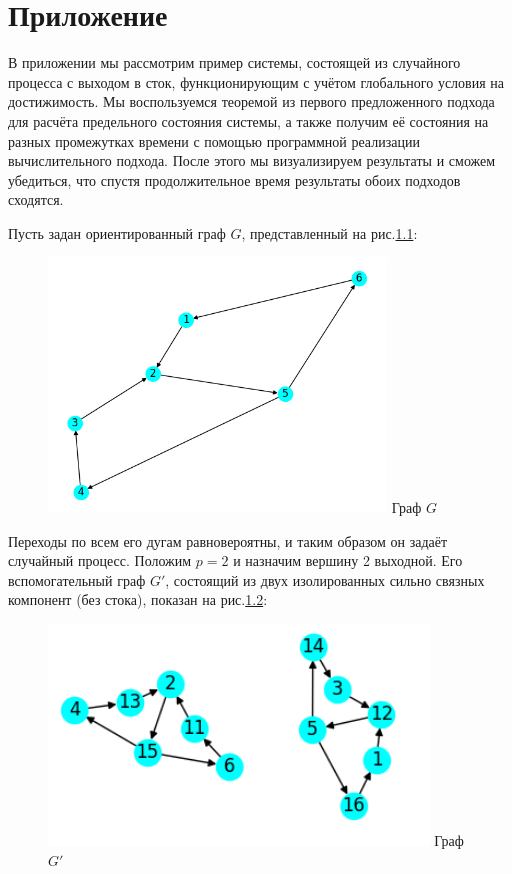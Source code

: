 \chapter{Приложение}

В приложении мы рассмотрим пример системы, состоящей из случайного процесса с выходом в сток, функционирующим с учётом глобального условия на достижимость.
Мы воспользуемся теоремой из первого предложенного подхода для расчёта предельного состояния системы, а также получим её состояния на разных промежутках времени с помощью программной реализации вычислительного подхода. После этого мы визуализируем результаты и сможем убедиться, что спустя продолжительное время результаты обоих подходов сходятся. 

Пусть задан ориентированный граф $G$, представленный на рис.\ref{fig:pic_4}:

\begin{figure}
	\centering	
	{\includegraphics[width=0.8\textwidth]{img/4.png}}
	{Граф $G$}
	\label{fig:pic_4}
\end{figure}

Переходы по всем его дугам равновероятны, и таким образом он задаёт случайный процесс. Положим $p = 2$ и назначим вершину 2 выходной. Его вспомогательный граф $G'$, состоящий из двух изолированных сильно связных компонент (без стока), показан на рис.\ref{fig:pic_5}:

\begin{figure}
	\centering	
	{\includegraphics[width=0.9\textwidth]{img/5.png}}
	{Граф $G'$}
	\label{fig:pic_5}
\end{figure}

